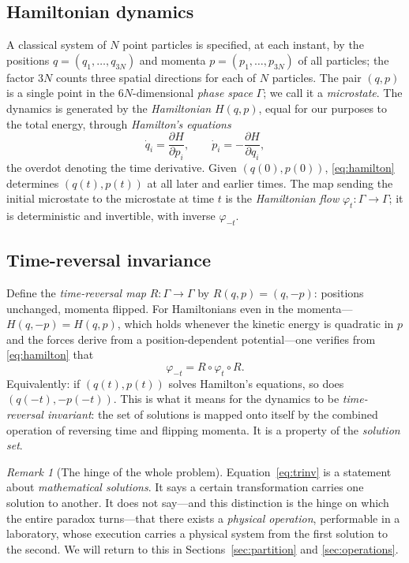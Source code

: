 \documentclass[11pt,a4paper]{article}
\theoremstyle{thmstyle}
\theoremstyle{definition}
\theoremstyle{remark}
\newtheorem{remark}[theorem]{Remark}
\begin{document}
\subsection{Hamiltonian dynamics}
\label{sec:hamiltonian}

A classical system of $N$ point particles is specified, at each instant,
by the positions $q=(q_{1},\dots,q_{3N})$ and momenta
$p=(p_{1},\dots,p_{3N})$ of all particles; the factor $3N$ counts three
spatial directions for each of $N$ particles. The pair $(q,p)$ is a
single point in the $6N$-dimensional \emph{phase space} $\Gamma$; we
call it a \emph{microstate}. The dynamics is generated by the
\emph{Hamiltonian} $H(q,p)$, equal for our purposes to the total energy,
through \emph{Hamilton's equations}
\begin{equation}
\dot{q}_{i}=\frac{\partial H}{\partial p_{i}},\qquad
\dot{p}_{i}=-\frac{\partial H}{\partial q_{i}},
\label{eq:hamilton}
\end{equation}
the overdot denoting the time derivative. Given $(q(0),p(0))$,
\eqref{eq:hamilton} determines $(q(t),p(t))$ at all later and earlier
times. The map sending the initial microstate to the microstate at time
$t$ is the \emph{Hamiltonian flow} $\varphi_{t}:\Gamma\to\Gamma$; it is
deterministic and invertible, with inverse $\varphi_{-t}$.

\subsection{Time-reversal invariance}
\label{sec:time-reversal}

Define the \emph{time-reversal map} $R:\Gamma\to\Gamma$ by
$R(q,p)=(q,-p)$: positions unchanged, momenta flipped. For Hamiltonians
even in the momenta---$H(q,-p)=H(q,p)$, which holds whenever the kinetic
energy is quadratic in $p$ and the forces derive from a
position-dependent potential---one verifies from \eqref{eq:hamilton}
that
\begin{equation}
\varphi_{-t}=R\circ\varphi_{t}\circ R.
\label{eq:trinv}
\end{equation}
Equivalently: if $(q(t),p(t))$ solves Hamilton's equations, so does
$(q(-t),-p(-t))$. This is what it means for the dynamics to be
\emph{time-reversal invariant}: the set of solutions is mapped onto
itself by the combined operation of reversing time and flipping momenta.
It is a property of the \emph{solution set}.

\begin{remark}[The hinge of the whole problem]
\label{rem:hinge}
Equation~\eqref{eq:trinv} is a statement about \emph{mathematical
solutions}. It says a certain transformation carries one solution to
another. It does not say---and this distinction is the hinge on which the
entire paradox turns---that there exists a \emph{physical operation},
performable in a laboratory, whose execution carries a physical system
from the first solution to the second. We will return to this in
Sections~\ref{sec:partition} and \ref{sec:operations}.
\end{remark}
\end{document}
